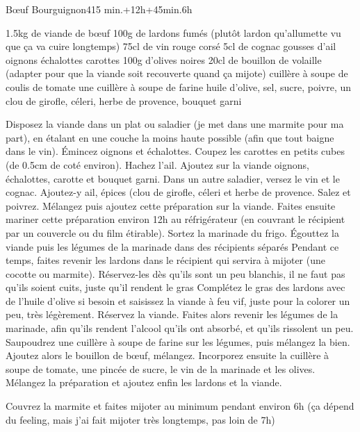 \begin{recette}{Bœuf Bourguignon}{4}{15 min.+12h+45min.}{6h}
\begin{ingredients}
\ingredient 1.5kg de viande de bœuf
\ingredient 100g de lardons fumés (plutôt lardon qu'allumette vu que ça va cuire longtemps)
\ingredient 75cl de vin rouge corsé
\ingredient 5cl de cognac
 gousses d'ail
 oignons
 échalottes
 carottes
\ingredient 100g d'olives noires
\ingredient 20cl de bouillon de volaille (adapter pour que la viande soit recouverte quand ça mijote)
 cuillère à soupe de coulis de tomate
\ingredient une cuillère à soupe de farine
\ingredient huile d'olive, sel, sucre, poivre, un clou de girofle, céleri, herbe de provence, bouquet garni
\end{ingredients}

\begin{preparation}
\etape Disposez la viande dans un plat ou saladier (je met dans une marmite pour ma part), en étalant en une couche la moins 
haute possible (afin que tout baigne dans le vin). 
\etape Émincez oignons et échalottes. Coupez les carottes en petits cubes (de 0.5cm de coté environ). Hachez l'ail. 
\etape Ajoutez sur la viande oignons, échalottes, carotte et bouquet garni. 
\etape Dans un autre saladier, versez le vin et le cognac. Ajoutez-y ail, épices (clou de girofle, céleri et herbe de 
provence. Salez et poivrez. Mélangez puis ajoutez cette préparation sur la viande.
\etape Faites ensuite mariner cette préparation environ 12h au réfrigérateur (en couvrant le récipient par un couvercle ou du
film étirable). 
\etape Sortez la marinade du frigo. Égouttez la viande puis les légumes de la marinade dans des récipients séparés
\etape Pendant ce temps, faites revenir les lardons dans le récipient qui servira à mijoter (une cocotte ou marmite).
Réservez-les dès qu'ils sont un peu blanchis, il ne faut pas qu'ils soient cuits, juste qu'il rendent le gras
\etape Complétez le gras des lardons avec de l'huile d'olive si besoin et saisissez la viande à feu vif, juste pour la colorer
un peu, très légèrement. Réservez la viande. 
\etape Faites alors revenir les légumes de la marinade, afin qu'ils rendent l'alcool qu'ils ont absorbé, et qu'ils rissolent un
peu. 
\etape Saupoudrez une cuillère à soupe de farine sur les légumes, puis mélangez la bien. Ajoutez alors le bouillon de bœuf,
mélangez. 
\etape Incorporez ensuite la cuillère à soupe de tomate, une pincée de sucre, le vin de la marinade et les olives. 
\etape Mélangez la préparation et ajoutez enfin les lardons et la viande. 
\end{preparation}

\begin{cuisson}
Couvrez la marmite et faites mijoter au minimum pendant environ 6h (ça dépend du feeling, mais j'ai fait mijoter très longtemps,
pas loin de 7h)
\end{cuisson}

\end{recette}

